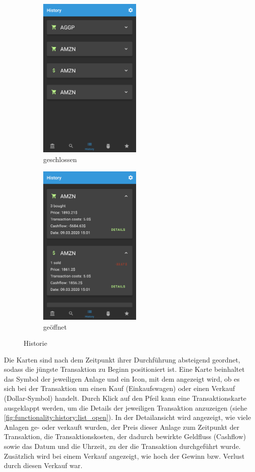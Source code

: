\documentclass[a4paper]{article}
\begin{document}
\begin{figure}[H]
	\centering
    \begin{subfigure}{.49\textwidth}
        \centering
        \includegraphics[height=8cm,keepaspectratio]{./images/history_list.png}
        \caption{geschlossen}
        \label{fig:functionality:history:list:closed}
    \end{subfigure}
    \begin{subfigure}{.49\textwidth}
        \centering
        \includegraphics[height=8cm,keepaspectratio]{./images/history_list_open.png}
        \caption{geöffnet}
        \label{fig:functionality:history:list:open}
    \end{subfigure}
	\caption{Historie}
	\label{fig:functionality:history:list}
\end{figure}

Die Karten sind nach dem Zeitpunkt ihrer Durchführung absteigend geordnet, sodass die jüngste Transaktion zu Beginn positioniert ist. Eine Karte beinhaltet das Symbol der jeweiligen Anlage und ein Icon, mit dem angezeigt wird, ob es sich bei der Transaktion um einen Kauf (Einkaufswagen) oder einen Verkauf (Dollar-Symbol) handelt. Durch Klick auf den Pfeil kann eine Transaktionskarte ausgeklappt werden, um die Details der jeweiligen Transaktion anzuzeigen (siehe \autoref{fig:functionality:history:list_open}). In der Detailansicht wird angezeigt, wie viele Anlagen ge- oder verkauft wurden, der Preis dieser Anlage zum Zeitpunkt der Transaktion, die Transaktionskosten, der dadurch bewirkte Geldfluss (Cashflow) sowie das Datum und die Uhrzeit, zu der die Transaktion durchgeführt wurde. Zusätzlich wird bei einem Verkauf angezeigt, wie hoch der Gewinn bzw. Verlust durch diesen Verkauf war.
\end{document}
